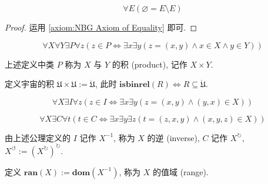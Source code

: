 \begin{corollary}
    \[
        \forall E (\varnothing = E \setminus E)
    \]

    \begin{proof}
        运用 \ref{axiom:NBG Axiom of Equality} 即可.
    \end{proof}
\end{corollary}

\begin{axiom}
    \label {axiom:NBG Axiom of Product}
    \[
        \forall X \forall Y \exists P \forall z (z \in P \Leftrightarrow \exists x \exists y (z = (x,y) \land x \in X \land y \in Y))
    \]
\end{axiom}

\begin{definition}
    \label {definition:product of two classes}
    上述定义中类 \(P\) 称为 \(X\) 与 \(Y\) 的积 (product), 记作 \(X \times Y\).
\end{definition}

\begin{definition}
    定义宇宙的积 \(\mathfrak{U} \times \mathfrak{U} := \ddot {\mathfrak{U}}\),
    此时 \(\mathbf{isbinrel} (R) \Leftrightarrow R \subseteq \ddot {\mathfrak{U}}\).
\end{definition}

\begin{axiom}
    \label {axiom:NBG Axiom of Inversion}
    \[
        \forall X \exists I \forall z (z \in I \Leftrightarrow \exists x \exists y (z = (x,y) \land (y,x) \in X))
    \]
\end{axiom}

\begin{axiom}
    \label {axiom:NBG Axiom of Cycle}
    \[
        \forall X \exists C \forall t (t \in C \Leftrightarrow \exists x \exists y \exists z (t = (z,x,y) \land (x,y,z) \in X))
    \]
\end{axiom}

\begin{definition}
    由上述公理定义的 \(I\) 记作 \(X^{-1}\), 称为 \(X\) 的逆 (inverse), \(C\) 记作 \(X^{\circlearrowright}\), \(X^{\circlearrowleft} := {(X^{\circlearrowright})}^{\circlearrowright}\).
\end{definition}

\begin{definition}
    \label {definition:range}
    定义 \(\mathbf{ran} (X) := \mathbf{dom} (X^{-1})\), 称为 \(X\) 的值域 (range).
\end{definition}

